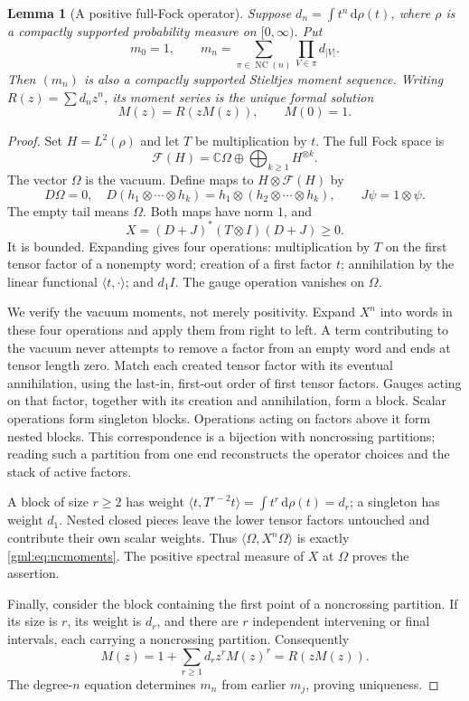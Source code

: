 \documentclass[11pt]{article}
\numberwithin{equation}{section}
\newtheorem{lemma}[theorem]{Lemma}
\theoremstyle{definition}
\theoremstyle{remark}
\newcommand{\C}{\mathbb C}
\newcommand{\dd}{\,\mathrm d}
\newcommand{\NC}{\operatorname{NC}}
\newcommand{\Fock}{\mathcal F}
\begin{document}
\begin{lemma}[A positive full-Fock operator]\label{gml:lem:fock}
Suppose $d_n=\int t^n\dd\rho(t)$, where $\rho$ is a compactly supported
probability measure on $[0,\infty)$. Put
\begin{equation}\label{gml:eq:ncmoments}
 m_0=1,\qquad
 m_n=\sum_{\pi\in\NC(n)}\prod_{V\in\pi}d_{|V|}.
\end{equation}
Then $(m_n)$ is also a compactly supported Stieltjes moment sequence.
Writing $R(z)=\sum d_nz^n$, its moment series is the unique formal solution
\begin{equation}\label{gml:eq:ncseries}
 M(z)=R(zM(z)),\qquad M(0)=1.
\end{equation}
\end{lemma}
\begin{proof}
Set $H=L^2(\rho)$ and let $T$ be multiplication by $t$. The full Fock space is
\[
 \Fock(H)=\C\Omega\oplus\bigoplus_{k\ge1}H^{\otimes k}.
\]
The vector $\Omega$ is the vacuum. Define maps to $H\otimes\Fock(H)$ by
\[
 D\Omega=0,\quad D(h_1\otimes\cdots\otimes h_k)
       =h_1\otimes(h_2\otimes\cdots\otimes h_k),\qquad
 J\psi=1\otimes\psi.
\]
The empty tail means $\Omega$. Both maps have norm $1$, and
\begin{equation}\label{gml:eq:Xpositive}
 X=(D+J)^*(T\otimes I)(D+J)\ge0.
\end{equation}
It is bounded. Expanding gives four operations: multiplication by $T$ on
the first tensor factor of a nonempty word; creation of a first factor
$t$; annihilation by the linear functional $\langle t,\cdot\rangle$; and
$d_1I$. The gauge operation vanishes on $\Omega$.

We verify the vacuum moments, not merely positivity. Expand $X^n$ into
words in these four operations and apply them from right to left.
A term contributing to the vacuum never attempts to remove a factor from
an empty word and ends at tensor length zero. Match each created tensor
factor with its eventual annihilation, using the last-in, first-out order
of first tensor factors. Gauges acting on that factor, together with its
creation and annihilation, form a block. Scalar operations form singleton
blocks. Operations acting on factors above it form nested blocks.
This correspondence is a bijection with noncrossing partitions; reading
such a partition from one end reconstructs the operator choices and the
stack of active factors.

A block of size $r\ge2$ has weight
$\langle t,T^{r-2}t\rangle=\int t^r\dd\rho(t)=d_r$; a singleton has
weight $d_1$. Nested closed pieces leave the lower tensor factors untouched
and contribute their own scalar weights. Thus
$\langle\Omega,X^n\Omega\rangle$ is exactly \eqref{gml:eq:ncmoments}.
The positive spectral measure of $X$ at $\Omega$ proves the assertion.

Finally, consider the block containing the first point of a noncrossing
partition. If its size is $r$, its weight is $d_r$, and there are $r$
independent intervening or final intervals, each carrying a noncrossing
partition. Consequently
\[
 M(z)=1+\sum_{r\ge1}d_r z^rM(z)^r=R(zM(z)).
\]
The degree-$n$ equation determines $m_n$ from earlier $m_j$, proving uniqueness.
\end{proof}
\end{document}
